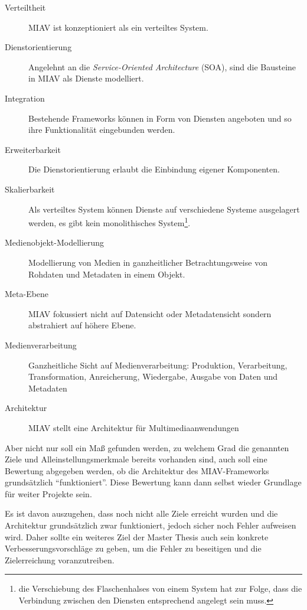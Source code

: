 \documentclass[12pt,headsepline,a4paper,bibtotoc,liststotoc,DIV12,BCOR12mm]{scrartcl}
\begin{document}
  \begin{description}
  	\item[Verteiltheit] MIAV ist konzeptioniert als ein verteiltes System.
  	\item[Dienstorientierung] Angelehnt an die \emph{Service-Oriented Architecture}  (SOA), sind die Bausteine in MIAV als Dienste modelliert.
  	\item[Integration] Bestehende Frameworks können in Form von Diensten angeboten und so ihre Funktionalität eingebunden werden.
  	\item[Erweiterbarkeit] Die Dienstorientierung erlaubt die Einbindung eigener Komponenten.
  	\item[Skalierbarkeit] Als verteiltes System können Dienste auf verschiedene Systeme ausgelagert werden, es gibt kein monolithisches System\footnote{die Verschiebung des Flaschenhalses von einem System hat zur Folge, dass die Verbindung zwischen den Diensten entsprechend angelegt sein muss.}.
  	\item[Medienobjekt-Modellierung] Modellierung von Medien in ganzheitlicher Betrachtungsweise von Rohdaten und Metadaten in einem Objekt.
  	\item[Meta-Ebene] MIAV fokussiert nicht auf Datensicht oder Metadatensicht sondern abstrahiert auf höhere Ebene.
  	\item[Medienverarbeitung] Ganzheitliche Sicht auf Medienverarbeitung: Produktion, Verarbeitung, Transformation, Anreicherung, Wiedergabe, Ausgabe von Daten und Metadaten
  	\item[Architektur] MIAV stellt eine Architektur für Multimediaanwendungen
  \end{description}
  
  Aber nicht nur soll ein Maß gefunden werden, zu welchem Grad die genannten Ziele und Alleinstellungsmerkmale bereits vorhanden sind, auch soll eine Bewertung abgegeben werden, ob die Architektur des MIAV-Frameworks grundsätzlich "`funktioniert"'. Diese Bewertung kann dann selbst wieder Grundlage für weiter Projekte sein.
  
  Es ist davon auszugehen, dass noch nicht alle Ziele erreicht wurden und die Architektur grundsätzlich zwar funktioniert, jedoch sicher noch Fehler aufweisen wird. Daher sollte ein weiteres Ziel der Master Thesis auch sein konkrete Verbesserungsvorschläge zu geben, um die Fehler zu beseitigen und die Zielerreichung voranzutreiben.
  
\end{document}
